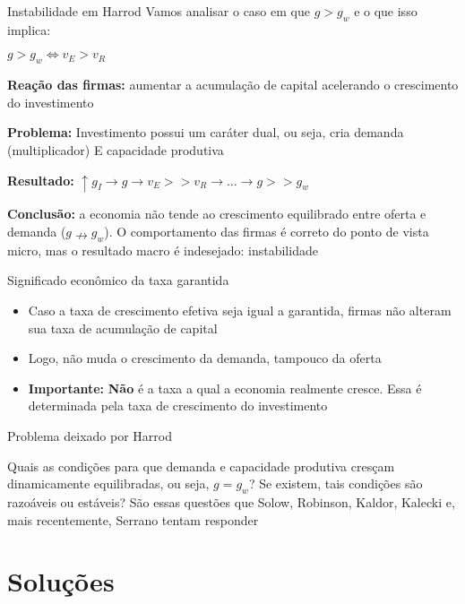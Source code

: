 \documentclass[10pt]{beamer}
\begin{document}
\begin{frame}{Instabilidade em Harrod}
Vamos analisar o caso em que $g>g_w$ e o que isso implica:

 $g>g_w \Leftrightarrow v_E>v_R$

\textbf{Reação das firmas:} aumentar a acumulação de capital acelerando o crescimento do investimento

\textbf{Problema:} Investimento possui um caráter dual, ou seja, cria demanda (multiplicador) E capacidade produtiva

\textbf{Resultado:} $\uparrow g_I \rightarrow g \rightarrow v_E >> v_R \rightarrow \ldots \rightarrow g >> g_w$


\textbf{Conclusão:} a economia não tende ao crescimento equilibrado entre oferta e demanda ($g \nrightarrow g_w$). O comportamento das firmas é correto do ponto de vista micro, mas o resultado macro é indesejado: instabilidade

\end{frame}

\begin{frame}{Significado econômico da taxa garantida}
	\begin{itemize}
		\item Caso a taxa de crescimento efetiva seja igual a garantida, firmas não alteram sua taxa de acumulação de capital
		\item Logo, não muda o crescimento da demanda, tampouco da oferta
		\item \textbf{Importante:} \textbf{Não} é a taxa a qual a economia realmente cresce. Essa é determinada pela taxa de crescimento do investimento
	\end{itemize}
	
	\begin{alertblock}{Problema deixado por Harrod}
		
		Quais as condições para que demanda e capacidade produtiva cresçam dinamicamente equilibradas, ou seja, $g = g_w$? Se existem, tais condições são razoáveis ou estáveis? São essas questões que Solow, Robinson, Kaldor, Kalecki e, mais recentemente, Serrano tentam responder
		
	\end{alertblock}
\end{frame}




\section{Soluções}
\end{document}
